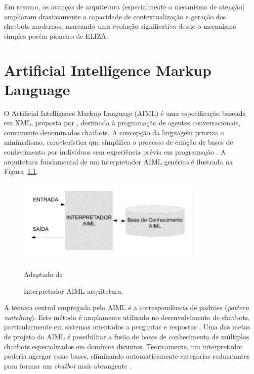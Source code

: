\documentclass[14pt,a4paper,oneside]{book}
\begin{document}
Em resumo, os avanços de arquitetura (especialmente o mecanismo de atenção) ampliaram drasticamente a capacidade de contextualização e geração dos chatbots modernos, marcando uma evolução significativa desde o mecanismo simples porém pioneiro de ELIZA.



\chapter{Artificial Intelligence Markup
Language}

O Artificial Intelligence Markup Language (AIML) é uma especificação baseada em XML, proposta por \cite{Wallace2009}, destinada à programação de agentes conversacionais, comumente denominados chatbots. A concepção da linguagem prioriza o minimalismo, característica que simplifica o processo de criação de bases de conhecimento por indivíduos sem experiência prévia em programação \cite{Wallace2009}. A arquitetura fundamental de um interpretador AIML genérico é ilustrada na Figura~\ref{fig:interpretador}.

\begin{figure}
    \centering
    \caption{Interpretador AIML arquitetura.}
    \includegraphics[width=0.8\textwidth]{./fig/image8} %
    \label{fig:interpretador}
    \vspace{0.2cm} %
    {\footnotesize 
	
	Adaptado de \cite{Silva2007}}
\end{figure}

A técnica central empregada pelo AIML é a correspondência de padrões (\emph{pattern matching}). Este método é amplamente utilizado no desenvolvimento de chatbots, particularmente em sistemas orientados a perguntas e respostas \cite{Abdul-Kader2015}. Uma das metas de projeto do AIML é possibilitar a fusão de bases de conhecimento de múltiplos chatbots especializados em domínios distintos. Teoricamente, um interpretador poderia agregar essas bases, eliminando automaticamente categorias redundantes para formar um \emph{chatbot} mais abrangente \cite{Wallace2000}.
\end{document}
